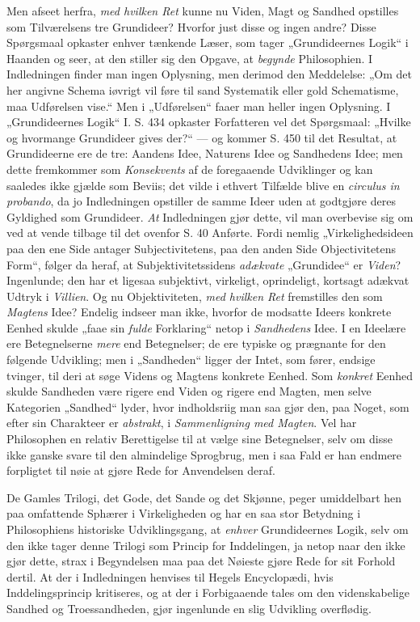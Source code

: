 \documentclass[12pt,a4paper]{book}
\newcommand{\opage}[1]{\marginnote{\footnotesize\textit{[#1]}}}
\begin{document}
Men afseet herfra, \emph{med hvilken Ret} kunne nu
Viden, Magt og Sandhed opstilles som Tilværelsens tre
Grundideer? Hvorfor just disse og ingen andre? Disse
Spørgsmaal opkaster enhver tænkende Læser, som tager
„Grundideernes Logik“ i Haanden og seer, at den stiller sig
den Opgave, at \emph{begynde} Philosophien. I Indledningen
finder man ingen Oplysning, men derimod den Med\opage{42}\setcounter{footnote}{0}delelse:
„Om det her angivne Schema iøvrigt vil føre til
sand Systematik eller gold Schematisme, maa Udførelsen
vise.“ Men i „Udførelsen“ faaer man heller
ingen Oplysning. I „Grundideernes Logik“ I. S. 434
opkaster Forfatteren vel det Spørgsmaal: „Hvilke og
hvormange Grundideer gives der?“ --- og kommer S.
450 til det Resultat, at Grundideerne ere de tre: Aandens
Idee, Naturens Idee og Sandhedens Idee; men
dette fremkommer som \emph{Konsekvents} af de foregaaende
Udviklinger og kan saaledes ikke gjælde som Beviis;
det vilde i ethvert Tilfælde blive en \textit{circulus in
probando}, da jo Indledningen opstiller de samme Ideer
uden at godtgjøre deres Gyldighed som Grundideer.
\emph{At} Indledningen gjør dette, vil man overbevise sig
om ved at vende tilbage til det ovenfor S. 40 Anførte.
Fordi nemlig „Virkelighedsideen paa den ene Side antager
Subjectivitetens, paa den anden Side Objectivitetens
Form“, følger da heraf, at Subjektivitetssidens
\emph{adækvate} „Grundidee“ er \emph{Viden}? Ingenlunde; den
har et ligesaa subjektivt, virkeligt, oprindeligt, kortsagt
adækvat Udtryk i \emph{Villien}. Og nu Objektiviteten, \emph{med
hvilken Ret} fremstilles den som \emph{Magtens} Idee? Endelig
indseer man ikke, hvorfor de modsatte Ideers
konkrete Eenhed skulde „faae sin \emph{fulde} Forklaring“ netop
i \emph{Sandhedens} Idee. I en Ideelære ere Betegnelserne
\emph{mere} end Betegnelser; de ere typiske og prægnante
for den følgende Udvikling; men i „Sandheden“ ligger
der Intet, som fører, endsige tvinger, til deri at søge
Videns og Magtens konkrete Eenhed. Som \emph{konkret}
\opage{43}\setcounter{footnote}{0}%
Eenhed skulde Sandheden være rigere end Viden og
rigere end Magten, men selve Kategorien „Sandhed“
lyder, hvor indholdsriig man saa gjør den, paa Noget,
som efter sin Charakteer er \emph{abstrakt}, i \emph{Sammenligning
med Magten}. Vel har Philosophen en relativ
Berettigelse til at vælge sine Betegnelser, selv om disse
ikke ganske svare til den almindelige Sprogbrug, men i
saa Fald er han endmere forpligtet til nøie at gjøre
Rede for Anvendelsen deraf.

De Gamles Trilogi, det Gode, det Sande og det
Skjønne, peger umiddelbart hen paa omfattende Sphærer
i Virkeligheden og har en saa stor Betydning i Philosophiens
historiske Udviklingsgang, at \emph{enhver} Grundideernes
Logik, selv om den ikke tager denne Trilogi som
Princip for Inddelingen, ja netop naar den ikke gjør dette,
strax i Begyndelsen maa paa det Nøieste gjøre Rede for sit
Forhold dertil. At der i Indledningen henvises til Hegels
Encyclopædi, hvis Inddelingsprincip kritiseres, og at der
i Forbigaaende tales om den videnskabelige Sandhed og
Troessandheden, gjør ingenlunde en slig Udvikling overflødig.
\end{document}
